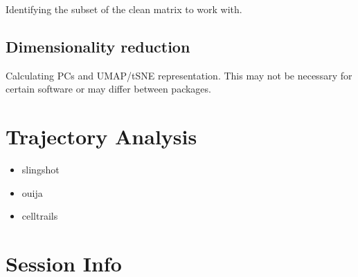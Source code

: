 \documentclass[]{book}
\providecommand{\tightlist}{%
  \setlength{\itemsep}{0pt}\setlength{\parskip}{0pt}}
\begin{document}
Identifying the subset of the clean matrix to work with.

\hypertarget{dimensionality-reduction-1}{%
\subsection{Dimensionality reduction}\label{dimensionality-reduction-1}}

Calculating PCs and UMAP/tSNE representation. This may not be necessary for certain software or may differ between packages.

\hypertarget{trajectory-analysis}{%
\section{Trajectory Analysis}\label{trajectory-analysis}}

\begin{itemize}
\tightlist
\item
  slingshot
\item
  ouija
\item
  celltrails
\end{itemize}

\hypertarget{session-info-1}{%
\section{Session Info}\label{session-info-1}}


\end{document}

